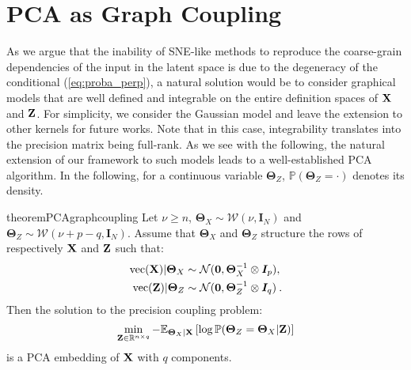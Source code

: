 \section{PCA as Graph Coupling}\label{sec:pca_graph_coupling}


As we argue that the inability of SNE-like methods to reproduce the coarse-grain dependencies of the input in the latent space is due to the degeneracy of the conditional (\ref{eq:proba_perp}), a natural solution would be to consider graphical models that are well defined and integrable on the entire definition spaces of $\mathbf{X}$ and $\mathbf{Z}$. For simplicity, we consider the Gaussian model and leave the extension to other kernels for future works. Note that in this case, integrability translates into the precision matrix being full-rank. As we see with the following, the natural extension of our framework to such models leads to a well-established PCA algorithm. In the following, for a continuous variable $\bm{\Theta}_{Z}$, $\mathbb{P}(\bm{\Theta}_{Z} = \cdot)$ denotes its density.


\begin{restatable}{theorem}{PCAgraphcoupling}
\label{PCA_graph_coupling}
Let $\nu \geq n$,  $\bm{\Theta}_{X} \sim \mathcal{W}(\nu, \bm{I}_N)$ and $\bm{\Theta}_{Z} \sim \mathcal{W}(\nu + p - q, \bm{I}_N)$. Assume that $\bm{\Theta}_{X}$ and $\bm{\Theta}_{Z}$ structure the rows of respectively $\mathbf{X}$ and $\mathbf{Z}$ such that: 
\begin{align}
    \mathrm{vec}(\mathbf{X}) | \bm{\Theta}_{X} &\sim \mathcal{N}(\bm{0}, \bm{\Theta}_{X}^{-1} \otimes \bm{I}_p), \label{eq:X_given_theta} \\
    \mathrm{vec}(\mathbf{Z}) | \bm{\Theta}_{Z} &\sim \mathcal{N}(\bm{0}, \bm{\Theta}_{Z}^{-1} \otimes \bm{I}_q) \label{eq:Z_given_theta} \:.
\end{align}
Then the solution to the precision coupling problem:
\begin{align*}
    \min_{\mathbf{Z} \in \mathbb{R}^{n \times q}} -\mathbb{E}_{\bm{\Theta}_{X} | \mathbf{X}}\left[\log \mathbb{P}(\bm{\Theta}_{Z}=\bm{\Theta}_{X}|\mathbf{Z})\right]
\end{align*}
is a PCA embedding of $\mathbf{X}$ with $q$ components.
\end{restatable}

